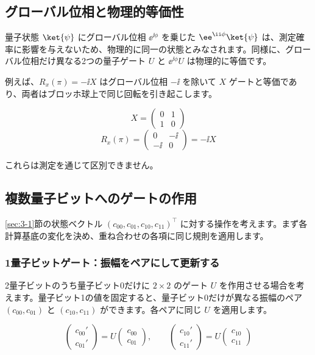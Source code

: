 \subsection{グローバル位相と物理的等価性}

量子状態 $\ket{\psi}$ にグローバル位相 $\ee^{\ii\phi}$ を乗じた $\ee^{\ii\phi}\ket{\psi}$ は、測定確率に影響を与えないため、物理的に同一の状態とみなされます。同様に、グローバル位相だけ異なる2つの量子ゲート $U$ と $\ee^{\ii\phi} U$ は物理的に等価です。

例えば、$R_x(\pi) = -\ii X$ はグローバル位相 $-\ii$ を除いて $X$ ゲートと等価であり、両者はブロッホ球上で同じ回転を引き起こします。

\[
X = \begin{pmatrix} 0 & 1 \\ 1 & 0 \end{pmatrix}
\]
\[
R_x(\pi) = \begin{pmatrix} 0 & -\ii \\ -\ii & 0 \end{pmatrix} = -\ii X
\]

これらは測定を通じて区別できません。

\subsection{複数量子ビットへのゲートの作用}

\ref{sec:3-1}節の状態ベクトル $(c_{00}, c_{01}, c_{10}, c_{11})^\top$ に対する操作を考えます。まず各計算基底の変化を決め、重ね合わせの各項に同じ規則を適用します。

\subsubsection{1量子ビットゲート：振幅をペアにして更新する}

2量子ビットのうち量子ビット0だけに $2\times2$ のゲート $U$ を作用させる場合を考えます。量子ビット1の値を固定すると、量子ビット0だけが異なる振幅のペア $(c_{00}, c_{01})$ と $(c_{10}, c_{11})$ ができます。各ペアに同じ $U$ を適用します。

\[
\begin{pmatrix} c_{00}' \\ c_{01}' \end{pmatrix} = U \begin{pmatrix} c_{00} \\ c_{01} \end{pmatrix},
\qquad
\begin{pmatrix} c_{10}' \\ c_{11}' \end{pmatrix} = U \begin{pmatrix} c_{10} \\ c_{11} \end{pmatrix}
\]

